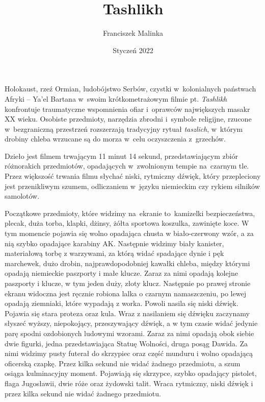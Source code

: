 \documentclass[14pt]{extarticle}
\title{Tashlikh}
\author{Franciszek Malinka}
\date{Styczeń 2022}
\begin{document}
\maketitle
Holokaust, rzeź Ormian, ludobójstwo Serbów, czystki w~kolonialnych państwach Afryki -- Ya'el Bartana w~swoim krótkometrażowym filmie pt. \textit{Tashlikh} konfrontuje traumatyczne wspomnienia ofiar i~oprawców największych masakr XX wieku. Osobiste przedmioty, narzędzia zbrodni i~symbole religijne, rzucone w~bezgraniczną przestrzeń rozszerzają tradycyjny rytuał \textit{taszlich}, w~którym drobiny chleba wrzucane są do morza w~celu oczyszczenia z~grzechów.  

Dzieło jest filmem trwającym 11 minut 14 sekund, przedstawiającym zbiór różnorakich przedmiotów, opadających w~zwolnionym tempie na~czarnym tle. Przez większość trwania filmu słychać niski, rytmiczny dźwięk, który przepleciony jest przenikliwym szumem, odliczaniem w~języku niemieckim czy rykiem silników samolotów.

Początkowe przedmioty, które widzimy na~ekranie to~kamizelki bezpieczeństwa, plecak, duża torba, klapki, dżinsy, żółta sportowa koszulka, zawinięte koce. W tym momencie pojawia się wolno opadająca chusta w biało-czerwony wzór, a za nią szybko opadające karabiny AK. Następnie widzimy biały kanister, materiałową torbę z warzywami, za którą widać spadające dynie i pęk marchewek, dużo drobin, najprawdopodobniej kawałki chleba, między którymi opadają niemieckie paszporty i małe klucze. Zaraz za nimi opadają kolejne paszporty i klucze, w tym jeden duży, złoty klucz. Następnie po prawej stronie ekranu widoczna jest ręcznie robiona lalka o czarnym namaszczeniu, po lewej opadają ziemniaki, które wypadają z worka. Powoli nasila się niski dźwięk. Pojawia się stara proteza oraz kula. Wraz z nasilaniem się dźwięku zaczynamy słyszeć wyższy, niepokojący, przeszywający dźwięk, a w tym czasie widać jedynie parę spodni ozdobionych ludowymi wzorami. Zaraz za nimi opadają obok siebie dwie figurki, jedna przedstawiająca Statuę Wolności, druga posąg Dawida. Za nimi widzimy pusty futerał do skrzypiec oraz część munduru i wolno opadającą oficerską czapkę. Przez kilka sekund nie widać żadnego przedmiotu, a szum osiąga kulminacyjny moment. Pojawiają się skrzypce, szybko opadający pistolet, flaga Jugosławii, dwie róże oraz żydowski talit. Wraca rytmiczny, niski dźwięk i przez kilka sekund nie widać żadnego przedmiotu.
\end{document}

